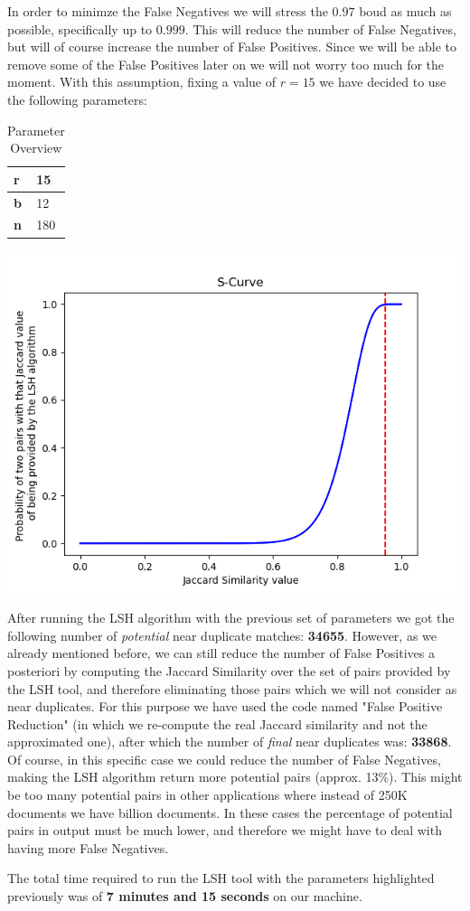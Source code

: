 \documentclass[12pt]{article}
\begin{document}
In order to minimze the False Negatives we will stress the $0.97$ boud as much as possible, specifically up to $0.999$. This will reduce the number of False Negatives, but will of course increase the number of False Positives. Since we will be able to remove some of the False Positives later on we will not worry too much for the moment. With this assumption, fixing a value of $r=15$ we have decided to use the following parameters:

\begin{table}[]
\centering
\begin{tabular}{|l|l|}
\hline
\textbf{r} & 15    \\ \hline
\textbf{b} & 12   \\ \hline
\textbf{n} & 180 \\ \hline
\end{tabular}
\caption{Parameter Overview}
\label{tab:my-table}
\end{table}

\begin{center}
\includegraphics[scale=.75]{Splot.png}
\end{center}

After running the LSH algorithm with the previous set of parameters we got the following number of \textit{potential} near duplicate matches: \textbf{34655}. However, as we already mentioned before, we can still reduce the number of False Positives a posteriori by computing the Jaccard Similarity over the set of pairs provided by the LSH tool, and therefore eliminating those pairs which we will not consider as near duplicates. For this purpose we have used the code named "False Positive Reduction" (in which we re-compute the real Jaccard similarity and not the approximated one), after which the number of \textit{final} near duplicates was: \textbf{33868}. Of course, in this specific case we could reduce the number of  False Negatives, making the LSH algorithm return more potential pairs (approx. 13$\%$). This might be too many potential pairs in other applications where instead of 250K documents we have billion documents. In these cases the percentage of potential pairs in output must be much lower, and therefore we might have to deal with having more False Negatives.

The total time required to run the LSH tool with the parameters highlighted previously was of \textbf{7 minutes and 15 seconds} on our machine.
\end{document}
